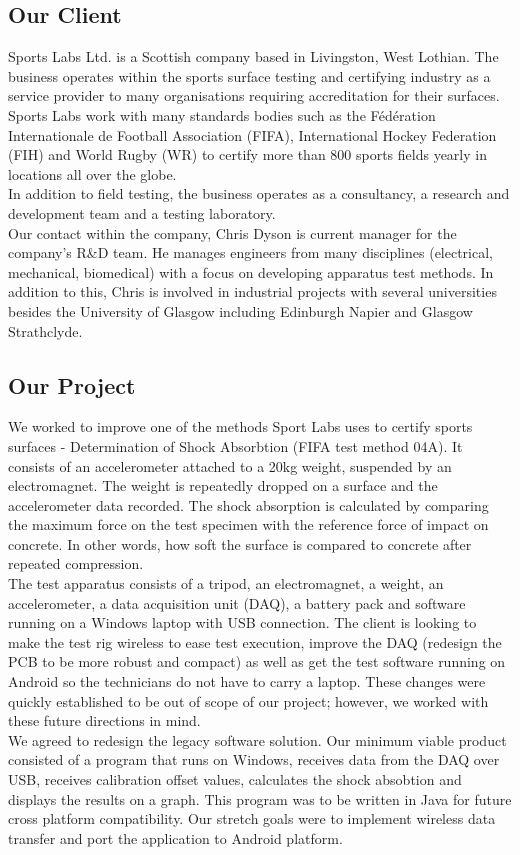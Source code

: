 \documentclass{l3proj}
\begin{document}
\subsection{Our Client}
Sports Labs Ltd. is a Scottish company based in Livingston, West Lothian. The business operates within the sports surface testing and certifying industry as a service provider to many organisations requiring accreditation for their surfaces. Sports Labs work with many standards bodies such as the Fédération Internationale de Football Association (FIFA), International Hockey Federation (FIH) and World Rugby (WR) to certify more than 800 sports fields yearly in locations all over the globe. \\
In addition to field testing, the business  operates as a consultancy, a research and development team and a testing laboratory.\\
Our contact within the company, Chris Dyson is current manager for the company's R\&D team. He manages engineers from many disciplines (electrical, mechanical, biomedical) with a focus on developing apparatus test methods. In addition to this, Chris is involved in industrial projects with several universities besides the University of Glasgow including Edinburgh Napier and Glasgow Strathclyde.  
\subsection{Our Project}
We worked to improve one of the methods Sport Labs uses to certify sports surfaces - Determination of Shock Absorbtion (FIFA test method 04A). It consists of an accelerometer attached to a 20kg weight, suspended by an electromagnet. The weight is repeatedly dropped on a surface and the accelerometer data recorded. The shock absorption is calculated by comparing the maximum force on the test specimen with the reference force of impact on concrete\cite{fifa}. In other words, how soft the surface is compared to concrete after repeated compression. \\
The test apparatus consists of a tripod, an electromagnet, a weight, an accelerometer, a data acquisition unit (DAQ), a battery pack and software running on a Windows laptop with USB connection. The client is looking to make the test rig wireless to ease test execution, improve the DAQ (redesign the PCB to be more robust and compact) as well as get the test software running on Android so the technicians do not have to carry a laptop. These changes were quickly established to be out of scope of our project; however, we worked with these future directions in mind. \\
We agreed to redesign the legacy software solution. Our minimum viable product consisted of a program that runs on Windows, receives data from the DAQ over USB, receives calibration offset values, calculates the shock absobtion and displays the results on a graph. This program was to be written in Java for future cross platform compatibility. Our stretch goals were to implement wireless data transfer and port the application to Android platform.
\end{document}
